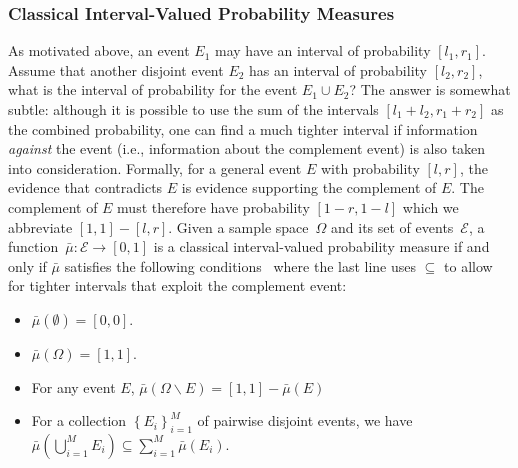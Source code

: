 \documentclass{article}
\theoremstyle{remark}
\newcommand{\events}{\ensuremath{\mathcal{E}}}
\begin{document}


\subsubsection{Classical Interval-Valued Probability Measures}

As motivated above, an event $E_{1}$ may have an interval of probability
$[l_{1},r_{1}]$. Assume that another disjoint event $E_{2}$ has
an interval of probability $[l_{2},r_{2}]$, what is the interval
of probability for the event $E_{1}\cup E_{2}$? The answer is somewhat
subtle: although it is possible to use the sum of the intervals $[l_{1}+l_{2},r_{1}+r_{2}]$
as the combined probability, one can find a much tighter interval
if information \emph{against} the event (i.e., information about the
complement event) is also taken into consideration. Formally, for
a general event $E$ with probability $[l,r]$, the evidence that
contradicts $E$ is evidence supporting the complement of $E$. The
complement of $E$ must therefore have probability $\left[1-r,1-l\right]$
which we abbreviate $\left[1,1\right]-\left[l,r\right]$. Given a
sample space~$\Omega$ and its set of events~$\events$, a function~$\bar{\mu}:\events\rightarrow[0,1]$
is a classical interval-valued probability measure if and only if
$\bar{\mu}$ satisfies the following conditions~\cite{JamisonLodwick2004}
where the last line uses $\subseteq$ to allow for tighter intervals
that exploit the complement event: 
\begin{itemize}
\item $\bar{\mu}(\emptyset)=[0,0]$. 
\item $\bar{\mu}(\Omega)=[1,1]$. 
\item For any event $E$, $\bar{\mu}\left(\Omega\backslash E\right)=\left[1,1\right]-\bar{\mu}\left(E\right)$ 
\item For a collection $\left\{ E_{i}\right\} _{i=1}^{M}$ of pairwise disjoint
events, we have $\bar{\mu}\left(\bigcup_{i=1}^{M}E_{i}\right)\subseteq\sum_{i=1}^{M}\bar{\mu}\left(E_{i}\right)$. 
\end{itemize}
\end{document}
